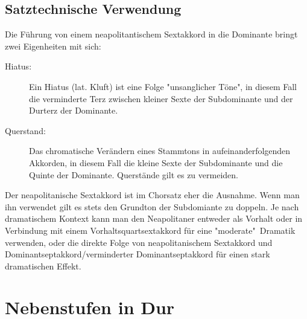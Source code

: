 \documentclass[a4paper]{article}
\begin{document}
	\subsection{Satztechnische Verwendung}
	Die Führung von einem neapolitantischem Sextakkord in die Dominante bringt zwei Eigenheiten mit sich:
	\begin{description}
		\item[Hiatus:] Ein Hiatus (lat. Kluft) ist eine Folge "{}unsanglicher Töne", in diesem Fall die verminderte Terz zwischen kleiner Sexte der Subdominante und der Durterz der Dominante.
		\item[Querstand:] Das chromatische Verändern eines Stammtons in aufeinanderfolgenden Akkorden, in diesem Fall die kleine Sexte der Subdominante und die Quinte der Dominante. Querstände gilt es zu vermeiden.
	\end{description}
	Der neapolitanische Sextakkord ist im Chorsatz eher die Ausnahme. Wenn man ihn verwendet gilt es stets den Grundton der Subdomiante zu doppeln. Je nach dramatischem Kontext kann man den Neapolitaner entweder als Vorhalt oder in Verbindung mit einem Vorhaltsquartsextakkord für eine "moderate"\ Dramatik verwenden, oder die direkte Folge von neapolitanischem Sextakkord und Dominantseptakkord/verminderter Dominantseptakkord für einen stark dramatischen Effekt.
	
	\section{Nebenstufen in Dur}
	
\end{document}
